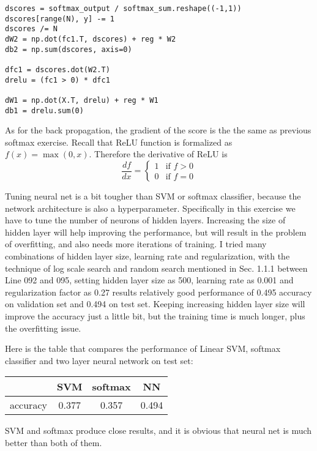 \documentclass{article} %
\begin{document}
\begin{lstlisting}
dscores = softmax_output / softmax_sum.reshape((-1,1))
dscores[range(N), y] -= 1
dscores /= N
dW2 = np.dot(fc1.T, dscores) + reg * W2
db2 = np.sum(dscores, axis=0)

dfc1 = dscores.dot(W2.T)
drelu = (fc1 > 0) * dfc1

dW1 = np.dot(X.T, drelu) + reg * W1
db1 = drelu.sum(0)
\end{lstlisting}
As for the back propagation, the gradient of the score is the the same as previous softmax exercise. Recall that ReLU function is formalized as $f(x)=\max(0,x)$. Therefore the derivative of ReLU is $$\frac{df}{dx}=\left\{\begin{array}{ll}
  1 & \mbox{if $f>0$}\\
  0 & \mbox{if $f=0$}
\end{array}\right.$$

Tuning neural net is a bit tougher than SVM or softmax classifier, because the network architecture is also a hyperparameter. Specifically in this exercise we have to tune the number of neurons of hidden layers. Increasing the size of hidden layer will help improving the performance, but will result in the problem of overfitting, and also needs more iterations of training. I tried many combinations of hidden layer size, learning rate and regularization, with the technique of log scale search and random search mentioned in Sec. 1.1.1 between Line 092 and 095, setting hidden layer size as 500, learning rate as 0.001 and regularization factor as 0.27 results relatively good performance of 0.495 accuracy on validation set and 0.494 on test set. Keeping increasing hidden layer size will improve the accuracy just a little bit, but the training time is much longer, plus the overfitting issue.

Here is the table that compares the performance of Linear SVM, softmax classifier and two layer neural network on test set:
\begin{table}[H]
\centering
  \begin{tabular}{c|c|c|c}
    \hline
    & SVM & softmax & NN\\
    \hline
    accuracy & 0.377 & 0.357 & 0.494\\
    \hline
  \end{tabular}
\end{table}

SVM and softmax produce close results, and it is obvious that neural net is much better than both of them.
\end{document}

